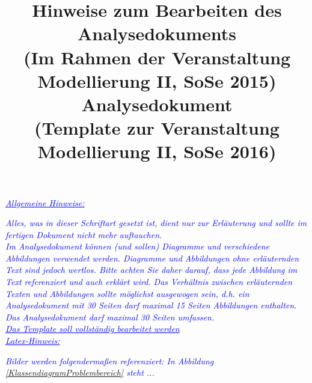 \documentclass[includeheaders]{scrartcl}
\begin{document}

\setlength{\parindent}{0pt}


\title{Hinweise zum Bearbeiten des Analysedokuments\\ \small{(Im Rahmen der Veranstaltung Modellierung II, SoSe 2015)}
}
\date{}
\author{}
\maketitle
\textcolor{blue}{\itshape{\underline{Allgemeine Hinweise:}}}

\textcolor{blue}{\itshape{Alles, was in dieser Schriftart gesetzt ist, dient nur zur Erläuterung und sollte im fertigen Dokument nicht mehr auftauchen.}}
\\

\textcolor{blue}{\itshape{Im Analysedokument können (und sollen) Diagramme und verschiedene Abbildungen verwendet werden. Diagramme und Abbildungen ohne erläuternden Text sind jedoch wertlos. Bitte achten Sie daher  darauf, dass jede Abbildung im Text referenziert und auch erklärt wird. Das Verhältnis zwischen erläuternden Texten und  Abbildungen sollte möglichst ausgewogen sein, d.h. ein Analysedokument mit 30 Seiten darf maximal 15 Seiten Abbildungen enthalten. Das Analysedokument darf maximal 30 Seiten umfassen.}}
\\

\textcolor{blue}{\itshape{\underline{Das Template soll vollständig bearbeitet werden}}}
\\

\textcolor{blue}{\itshape{\underline{Latex-Hinweis:}}}

\textcolor{blue}{\itshape{Bilder werden folgendermaßen referenziert: In Abbildung \ref{KlassendiagramProblembereich} steht ...}}

\newpage

\newpage 

\title{Analysedokument\\ \small{(Template zur Veranstaltung Modellierung II, SoSe 2016)}}
\date{}
\author{}
\end{document}

